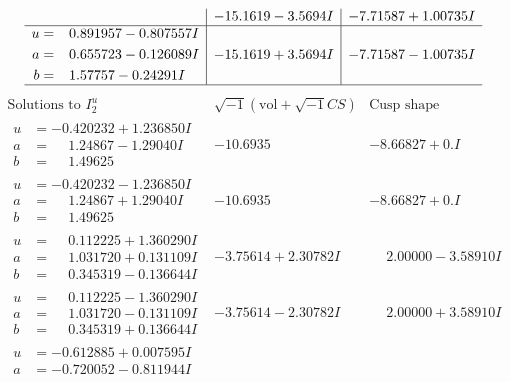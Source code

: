 \documentclass[1p]{elsarticle_modified}
\theoremstyle{definition}
\newcommand{\I}{\sqrt{-1}}
\begin{document}
$$\begin{array}{c|c|c}
 & -15.1619 - 3.5694 I & -7.71587 + 1.00735 I \\ \hline\begin{aligned}
u &= \phantom{-}0.891957 - 0.807557 I \\
a &= \phantom{-}0.655723 - 0.126089 I \\
b &= \phantom{-}1.57757 - 0.24291 I\end{aligned}
 & -15.1619 + 3.5694 I & -7.71587 - 1.00735 I\\
 \hline 
 \end{array}$$\newpage$$\begin{array}{c|c|c}  
\text{Solutions to }I^u_{2}& \I (\text{vol} + \sqrt{-1}CS) & \text{Cusp shape}\\
 \hline 
\begin{aligned}
u &= -0.420232 + 1.236850 I \\
a &= \phantom{-}1.24867 - 1.29040 I \\
b &= \phantom{-}1.49625\phantom{ +0.000000I}\end{aligned}
 & -10.6935\phantom{ +0.000000I} & -8.66827 + 0. I\phantom{ +0.000000I} \\ \hline\begin{aligned}
u &= -0.420232 - 1.236850 I \\
a &= \phantom{-}1.24867 + 1.29040 I \\
b &= \phantom{-}1.49625\phantom{ +0.000000I}\end{aligned}
 & -10.6935\phantom{ +0.000000I} & -8.66827 + 0. I\phantom{ +0.000000I} \\ \hline\begin{aligned}
u &= \phantom{-}0.112225 + 1.360290 I \\
a &= \phantom{-}1.031720 + 0.131109 I \\
b &= \phantom{-}0.345319 - 0.136644 I\end{aligned}
 & -3.75614 + 2.30782 I & \phantom{-}2.00000 - 3.58910 I \\ \hline\begin{aligned}
u &= \phantom{-}0.112225 - 1.360290 I \\
a &= \phantom{-}1.031720 - 0.131109 I \\
b &= \phantom{-}0.345319 + 0.136644 I\end{aligned}
 & -3.75614 - 2.30782 I & \phantom{-}2.00000 + 3.58910 I \\ \hline\begin{aligned}
u &= -0.612885 + 0.007595 I \\
a &= -0.720052 - 0.811944 I \\

\end{aligned}
\end{array}$$
\end{document}
